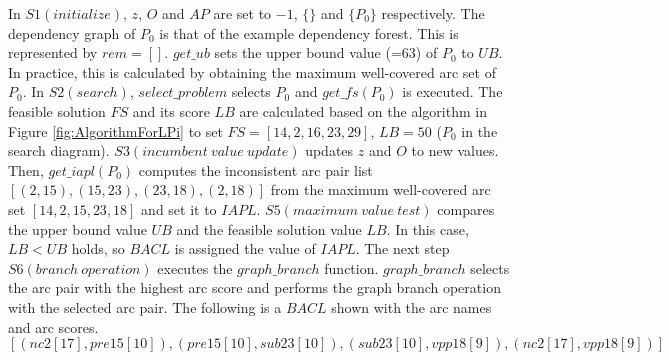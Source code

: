 In $S1(initialize)$, $z$, $O$ and $AP$ are set to $-1$,
$\{\}$ and $\{P_0\}$ respectively. The dependency graph of $P_0$ is that
of the example dependency forest. This is represented by
$rem=[]$. $get\_ub$ sets the upper bound value (=63) of $P_0$ to
$UB$. In practice, this is calculated by obtaining the maximum
well-covered arc set of $P_0$. In $S2(search)$, $select\_problem$
selects $P_0$ and $get\_fs(P_0)$ is executed. The feasible solution
$FS$ and its score $LB$ are calculated based on the algorithm in
Figure \ref{fig:AlgorithmForLPi} to set $FS=[14,2,16,23,29]$, $LB=50$ ($P_0$ in the search
diagram). $S3(incumbent\ value\ update)$ updates $z$ and $O$ to new
values. Then, $get\_iapl(P_0)$ computes the inconsistent arc pair list
$[(2,15),(15,23),(23,18),(2,18)]$ from the maximum well-covered arc
set $[14,2,15,23,18]$ and set it to $IAPL$. $S5(maximum\ value\ test)$
compares the upper bound value $UB$ and the feasible solution value
$LB$. In this case, $LB<UB$ holds, so $BACL$ is assigned the value of
$IAPL$. The next step $S6(branch\ operation)$ executes the $graph\_branch$
function. $graph\_branch$ selects the arc pair with the highest arc
score and performs the graph branch operation with the selected arc
pair. The following is a $BACL$ shown with the arc names and arc scores.
\[
 [(nc2[17],pre15[10]),(pre15[10],sub23[10]),(sub23[10],vpp18[9]),(nc2[17],vpp18[9])]
\]

